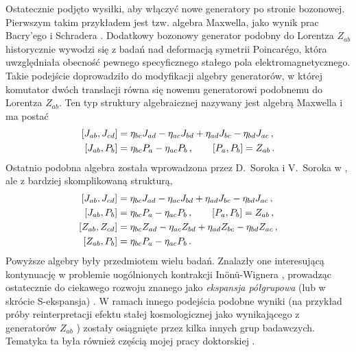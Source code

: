 \documentclass[12pt,a4paper]{article}
\begin{document}
Ostatecznie podjęto wysiłki, aby włączyć nowe generatory po stronie bozonowej. Pierwszym takim przykładem jest tzw. algebra Maxwella, jako wynik prac Bacry'ego i Schradera \cite{Bacry:1970ye, Schrader:1972zd}. Dodatkowy bozonowy generator podobny do Lorentza $Z_{ab}$ historycznie wywodzi się z badań nad deformacją symetrii Poincarégo, która uwzględniała obecność pewnego specyficznego stałego pola elektromagnetycznego. Takie podejście doprowadziło do modyfikacji algebry generatorów, w której komutator dwóch translacji równa się nowemu generatorowi podobnemu do Lorentza $Z_{ab}$. Ten typ struktury algebraicznej nazywany jest algebrą Maxwella i ma postać
\begin{align}\label{Maxwell}
	\left[ J_{ab},J_{cd}\right] &=\eta_{bc}J_{ad}-\eta_{ac}J_{bd}+\eta_{ad}J_{bc}-\eta_{bd}J_{ac}\,,\notag\\
	\left[ J_{ab},P_{b}\right] &=\eta _{bc}P_{a}-\eta _{ac}P_{b}\,,\qquad\left[ P_{a},P_{b}\right] =Z_{ab}\,.
\end{align} 
Ostatnio podobna algebra została wprowadzona przez D.~Soroka i V.~Soroka w \cite{Soroka:2006aj, Soroka:2011tc}, ale z bardziej skomplikowaną strukturą,
\begin{align}\label{Soroka}
	\left[ J_{ab},J_{cd}\right] &=\eta_{bc}J_{ad}-\eta_{ac}J_{bd}+\eta_{ad}J_{bc}-\eta_{bd}J_{ac}\,,\notag\\
	\left[ J_{ab},P_{b}\right] &=\eta _{bc}P_{a}-\eta _{ac}P_{b}\,,\qquad\left[ P_{a},P_{b}\right] =Z_{ab}\,,  \notag\\
	\left[Z_{ab},Z_{cd}\right] &=\eta_{bc}Z_{ad}-\eta_{ac}Z_{bd}+\eta_{ad}Z_{bc}-\eta_{bd}Z_{ac}\,,\notag\\
	\left[ Z_{ab},P_{b}\right] &=\eta _{bc}P_{a}-\eta _{ac}P_{b}\,.
\end{align}
Powyższe algebry były przedmiotem wielu badań. Znalazły one interesującą kontynuację w problemie uogólnionych kontrakcji In\"{o}n\"{u}-Wignera \cite{Inonu:1953sp, Lukierski:2010dy}, prowadząc ostatecznie do ciekawego rozwoju znanego jako \textit{ekspansja półgrupowa} (lub w skrócie S-ekspansja) \cite{Izaurieta:2006zz, Andrianopoli:2013ooa, Concha:2016kdz, deAzcarraga:2012zv}. W ramach innego podejścia podobne wyniki (na przykład próby reinterpretacji efektu stałej kosmologicznej jako wynikającego z generatorów $Z_{ab}$ \cite{deAzcarraga:2010sw}) zostały osiągnięte przez kilka innych grup badawczych. Tematyka ta była również częścią mojej pracy doktorskiej \cite{Durka:2011nf, Durka:2011gm}.

\end{document}
